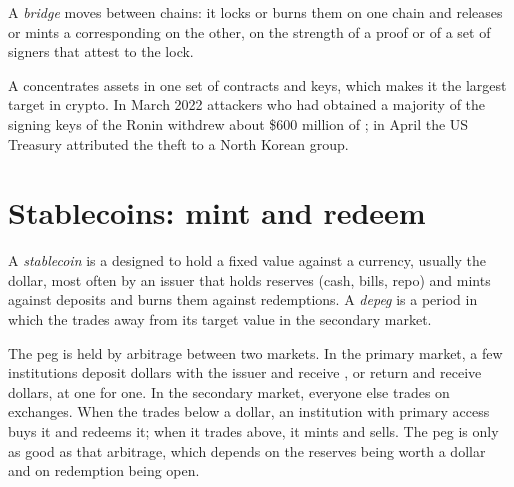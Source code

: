 \begin{definition}[Bridge]\label{def:m3:blockchains-for-traders:bridge}
A \emph{bridge} moves  between chains: it locks or burns them on one chain and releases
or mints a corresponding  on the other, on the strength of a proof or of a set of signers that attest
to the lock.
\end{definition}

A  concentrates assets in one set of contracts and keys, which makes it the largest target in crypto.
In March 2022 attackers who had obtained a majority of the signing keys of the Ronin  withdrew about
\$600 million of ; in April the US Treasury attributed the theft to a North Korean group.

\section{Stablecoins: mint and redeem}

\begin{definition}\label{def:m3:blockchains-for-traders:stable}
A \emph{stablecoin} is a  designed to hold a fixed value against a currency, usually
the dollar, most often by an issuer that holds reserves (cash, bills, repo) and mints  against deposits
and burns them against redemptions. A \emph{depeg} is a period in which the  trades away
from its target value in the secondary market.
\end{definition}

The peg is held by arbitrage between two markets. In the primary market, a few institutions deposit dollars
with the issuer and receive , or return  and receive dollars, at one for one. In the secondary
market, everyone else trades  on exchanges. When the  trades below a dollar, an institution with
primary access buys it and redeems it; when it trades above, it mints and sells. The peg is only as good as
that arbitrage, which depends on the reserves being worth a dollar and on redemption being open.

